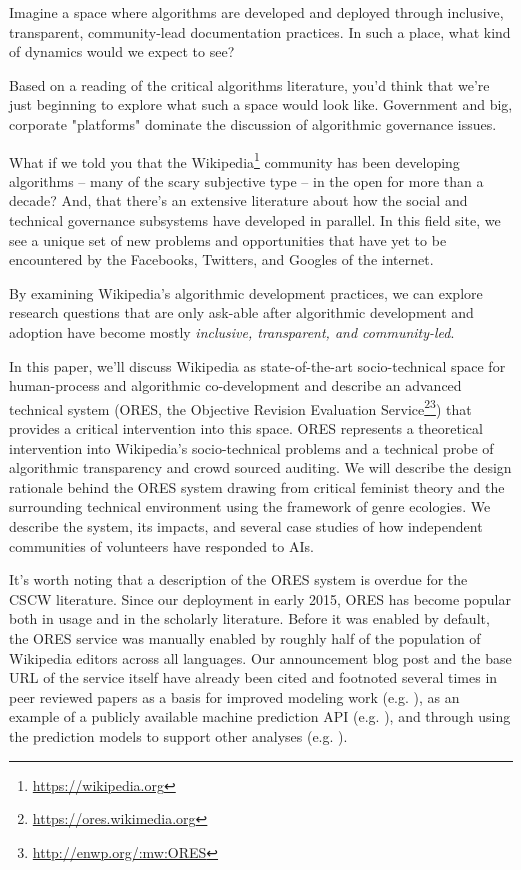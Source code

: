 Imagine a space where algorithms are developed and deployed through inclusive, transparent, community-lead documentation practices.  In such a place, what kind of dynamics would we expect to see?  

Based on a reading of the critical algorithms literature, you'd think that we're just beginning to explore what such a space would look like.  Government and big, corporate "platforms" dominate the discussion of algorithmic governance issues\cite{crawford2016algorithm}\cite{diakopoulos2015algorithmic}\cite{gillespie2014relevance}\cite{tufekci2015algorithms}.

What if we told you that the Wikipedia\footnote{\url{https://wikipedia.org}} community has been developing algorithms -- many of the scary subjective type -- in the open for more than a decade?  And, that there's an extensive literature about how the social and technical governance subsystems have developed in parallel.  In this field site, we see a unique set of new problems and opportunities that have yet to be encountered by the Facebooks, Twitters, and Googles of the internet. 

By examining Wikipedia's algorithmic development practices, we can explore research questions that are only ask-able after algorithmic development and adoption have become mostly \emph{inclusive, transparent, and community-led}.

In this paper, we'll discuss Wikipedia as state-of-the-art socio-technical space for human-process and algorithmic co-development and describe an advanced technical system (ORES, the Objective Revision Evaluation Service\footnote{\url{https://ores.wikimedia.org}}\footnote{\url{http://enwp.org/:mw:ORES}}) that provides a critical intervention into this space.  ORES represents a theoretical intervention into Wikipedia's socio-technical problems and a technical probe of algorithmic transparency and crowd sourced auditing.  We will describe the design rationale behind the ORES system drawing from critical feminist theory and the surrounding technical environment using the framework of genre ecologies.  We describe the system, its impacts, and several case studies of how independent communities of volunteers have responded to AIs.

It's worth noting that a description of the ORES system is overdue for the CSCW literature.  Since our deployment in early 2015, ORES has become popular both in usage and in the scholarly literature.  Before it was enabled by default, the ORES service was manually enabled by roughly half of the population of Wikipedia editors across all languages.  Our announcement blog post\cite{halfaker2015artificial} and the base URL of the service itself have already been cited and footnoted several times in peer reviewed papers as a basis for improved modeling work (e.g. \cite{dang2016quality}), as an example of a publicly available machine prediction API (e.g. \cite{lewoniewski2017relative}), and through using the prediction models to support other analyses (e.g. \cite{rezguia2017stigmergic}).

